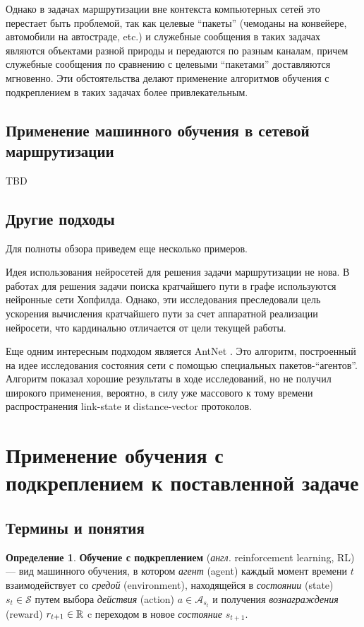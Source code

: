 \documentclass[specification,annotation,times]{itmo-student-thesis}
\theoremstyle{definition}
\newtheorem{definition-ru}{Определение}
\begin{document}
Однако в задачах маршрутизации вне контекста компьютерных сетей это перестает
быть проблемой, так как целевые \enquote{пакеты} (чемоданы на конвейере, автомобили на
автостраде, etc.) и служебные сообщения в таких задачах являются объектами разной природы и
передаются по разным каналам, причем служебные сообщения по сравнению с целевыми
\enquote{пакетами} доставляются мгновенно. Эти обстоятельства делают применение
алгоритмов обучения с подкреплением в таких задачах более привлекательным.

\subsection{Применение машинного обучения в сетевой маршрутизации}

TBD

\subsection{Другие подходы}

Для полноты обзора приведем еще несколько примеров.

Идея использования нейросетей для решения задачи маршрутизации не нова. В
работах \cite{ali-nn-routing, araujo2001neural} для решения задачи поиска кратчайшего пути в графе
используются нейронные сети Хопфилда. Однако, эти исследования преследовали цель
ускорения вычисления кратчайшего пути за счет аппаратной реализации нейросети,
что кардинально отличается от цели текущей работы.

Еще одним интересным подходом является AntNet \cite{di1998antnet}. Это алгоритм,
построенный на идее исследования состояния сети с помощью специальных
пакетов-\enquote{агентов}. Алгоритм показал хорошие результаты в ходе исследований, но
не получил широкого применения, вероятно, в силу уже массового к тому времени
распространения link-state и distance-vector протоколов.

\section{Применение обучения с подкреплением к поставленной задаче}

\subsection{Термины и понятия}

\begin{definition-ru}
  \textbf{Обучение с подкреплением} (\textit{англ.} reinforcement learning, RL) --- вид машинного
  обучения, в котором \textit{агент} (agent) каждый момент времени $t$ 
  взаимодействует со \textit{средой} (environment), находящейся в
  \textit{состоянии} (state) $s_t \in \mathcal{S}$ путем выбора
  \textit{действия} (action) $a \in \mathcal{A}_{s_t}$ и получения
  \textit{вознаграждения} (reward) $r_{t+1} \in \Bbb{R}$ c переходом в новое
  \textit{состояние} $s_{t+1}$.
\end{definition-ru}
\end{document}

